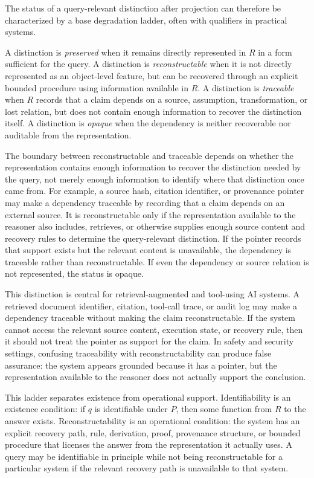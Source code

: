 \documentclass[11pt]{article}
\begin{document}
The status of a query-relevant distinction after projection can therefore be characterized by a base degradation ladder, often with qualifiers in practical systems.

A distinction is \emph{preserved} when it remains directly represented in $R$ in a form sufficient for the query. A distinction is \emph{reconstructable} when it is not directly represented as an object-level feature, but can be recovered through an explicit bounded procedure using information available in $R$. A distinction is \emph{traceable} when $R$ records that a claim depends on a source, assumption, transformation, or lost relation, but does not contain enough information to recover the distinction itself. A distinction is \emph{opaque} when the dependency is neither recoverable nor auditable from the representation.

The boundary between reconstructable and traceable depends on whether the representation contains enough information to recover the distinction needed by the query, not merely enough information to identify where that distinction once came from. For example, a source hash, citation identifier, or provenance pointer may make a dependency traceable by recording that a claim depends on an external source. It is reconstructable only if the representation available to the reasoner also includes, retrieves, or otherwise supplies enough source content and recovery rules to determine the query-relevant distinction. If the pointer records that support exists but the relevant content is unavailable, the dependency is traceable rather than reconstructable. If even the dependency or source relation is not represented, the status is opaque.

This distinction is central for retrieval-augmented and tool-using AI systems. A retrieved document identifier, citation, tool-call trace, or audit log may make a dependency traceable without making the claim reconstructable. If the system cannot access the relevant source content, execution state, or recovery rule, then it should not treat the pointer as support for the claim. In safety and security settings, confusing traceability with reconstructability can produce false assurance: the system appears grounded because it has a pointer, but the representation available to the reasoner does not actually support the conclusion.

This ladder separates existence from operational support. Identifiability is an existence condition: if $q$ is identifiable under $P$, then some function from $R$ to the answer exists. Reconstructability is an operational condition: the system has an explicit recovery path, rule, derivation, proof, provenance structure, or bounded procedure that licenses the answer from the representation it actually uses. A query may be identifiable in principle while not being reconstructable for a particular system if the relevant recovery path is unavailable to that system.
\end{document}
